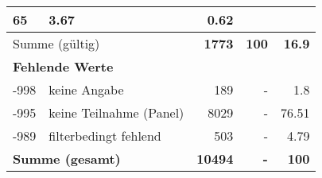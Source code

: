 \begin{longtable}{lXrrr}
       \num{65} &
       \num[round-mode=places,round-precision=2]{3,67} &
         \num[round-mode=places,round-precision=2]{0,62} \\
     \midrule
     \multicolumn{2}{l}{Summe (gültig)} &
       \textbf{\num{1773}} &
     \textbf{100} &
       \textbf{\num[round-mode=places,round-precision=2]{16,9}} \\
     \multicolumn{5}{l}{\textbf{Fehlende Werte}}\\
       -998 &
       keine Angabe &
         \num{189} &
        - &
         \num[round-mode=places,round-precision=2]{1,8} \\
       -995 &
       keine Teilnahme (Panel) &
         \num{8029} &
        - &
         \num[round-mode=places,round-precision=2]{76,51} \\
       -989 &
       filterbedingt fehlend &
         \num{503} &
        - &
         \num[round-mode=places,round-precision=2]{4,79} \\
     \midrule
     \multicolumn{2}{l}{\textbf{Summe (gesamt)}} &
          \textbf{\num{10494}} &
        \textbf{-} &
        \textbf{100} \\
     \bottomrule
     \end{longtable}
     
